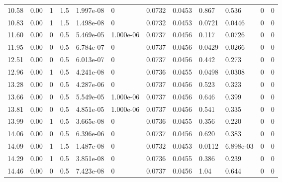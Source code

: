 \documentclass[preview]{standalone}
\begin{document}
{{\begin{tabular}{L{1.2cm}C{1.2cm} C{0.3cm}C{0.5cm} C{1.4cm}C{1.4cm} C{1.4cm}C{1.4cm} C{1.6cm}C{1.6cm} C{1.6cm}C{1.6cm}}
  10.58  &  0.00  & 1     & 1.5 &  1.997e-08  & 0  &  0.0732&   0.0453& 0.867 & 0.536   &  0 & 0  \\ 
  10.83  &  0.00  & 1     & 1.5 &  1.498e-08  & 0  &  0.0732&   0.0453& 0.0721 & 0.0446   &  0 & 0  \\ 
  11.60  &  0.00  & 0     & 0.5 &  5.469e-05  & 1.000e-06  &  0.0737&   0.0456& 0.117 & 0.0726   &  0 & 0  \\ 
  11.95  &  0.00  & 0     & 0.5 &  6.784e-07  & 0  &  0.0737&   0.0456& 0.0429 & 0.0266   &  0 & 0  \\ 
  12.51  &  0.00  & 0     & 0.5 &  6.013e-07  & 0  &  0.0737&   0.0456& 0.442 & 0.273   &  0 & 0  \\ 
  12.96  &  0.00  & 1     & 0.5 &  4.241e-08  & 0  &  0.0736&   0.0455& 0.0498 & 0.0308   &  0 & 0  \\ 
  13.28  &  0.00  & 0     & 0.5 &  4.287e-06  & 0  &  0.0737&   0.0456& 0.523 & 0.323   &  0 & 0  \\ 
  13.66  &  0.00  & 0     & 0.5 &  5.549e-05  & 1.000e-06  &  0.0737&   0.0456& 0.646 & 0.399   &  0 & 0  \\ 
  13.81  &  0.00  & 0     & 0.5 &  4.851e-05  & 1.000e-06  &  0.0737&   0.0456& 0.541 & 0.335   &  0 & 0  \\ 
  13.99  &  0.00  & 1     & 0.5 &  3.665e-08  & 0  &  0.0736&   0.0455& 0.356 & 0.220   &  0 & 0  \\ 
  14.06  &  0.00  & 0     & 0.5 &  6.396e-06  & 0  &  0.0737&   0.0456& 0.620 & 0.383   &  0 & 0  \\ 
  14.09  &  0.00  & 1     & 1.5 &  1.487e-08  & 0  &  0.0732&   0.0453& 0.0112 & 6.898e-03   &  0 & 0  \\ 
  14.29  &  0.00  & 1     & 0.5 &  3.851e-08  & 0  &  0.0736&   0.0455& 0.386 & 0.239   &  0 & 0  \\ 
  14.46  &  0.00  & 0     & 0.5 &  7.423e-08  & 0  &  0.0737&   0.0456& 1.04 & 0.644   &  0 & 0  \\ 
\hline 
\end{tabular} 

}}
\end{document}
